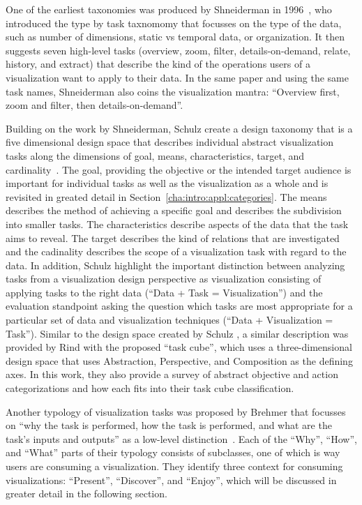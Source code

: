 One of the earliest taxonomies was produced by Shneiderman in 1996~\cite{shneiderman1996eyes}, who introduced the type by task taxnomomy that focusses on the type of the data, such as number of dimensions, static vs temporal data, or organization.  It then suggests seven high-level tasks (overview, zoom, filter, details-on-demand, relate, history, and extract) that describe the kind of the operations users of a visualization want to apply to their data.  In the same paper and using the same task names, Shneiderman also coins the visualization mantra: ``Overview first, zoom and filter, then details-on-demand''.

Building on the work by Shneiderman, Schulz \etal create a design taxonomy that is a five dimensional design space that describes individual abstract visualization tasks along the dimensions of goal, means, characteristics, target, and cardinality~\cite{schulz2013design}.  The goal, providing the objective or the intended target audience is important for individual tasks as well as the visualization as a whole and is revisited in greated detail in Section~\ref{cha:intro:appl:categories}.  The means describes the method of achieving a specific goal and describes the subdivision into smaller tasks.  The characteristics describe aspects of the data that the task aims to reveal.  The target describes the kind of relations that are investigated and the cadinality describes the scope of a visualization task with regard to the data.  In addition, Schulz \etal highlight the important distinction between analyzing tasks from a visualization design perspective as visualization consisting of applying tasks to the right data (``Data + Task = Visualization'') and the evaluation standpoint asking the question which tasks are most appropriate for a particular set of data and visualization techniques (``Data + Visualization = Task'').  Similar to the design space created by Schulz \etal , a similar description was provided by Rind \etal with the proposed ``task cube'', which uses a three-dimensional design space that uses Abstraction, Perspective, and Composition as the defining axes.  In this work, they also provide a survey of abstract objective and action categorizations and how each fits into their task cube classification.

Another typology of visualization tasks was proposed by Brehmer \etal that focusses on ``why the task is performed, how the task is performed, and what are the task's inputs and outputs'' as a low-level distinction~\cite{brehmer2013typology}.  Each of the ``Why'', ``How'', and ``What'' parts of their typology consists of subclasses, one of which is way users are consuming a visualization.  They identify three context for consuming visualizations: ``Present'', ``Discover'', and ``Enjoy'', which will be discussed in greater detail in the following section.





